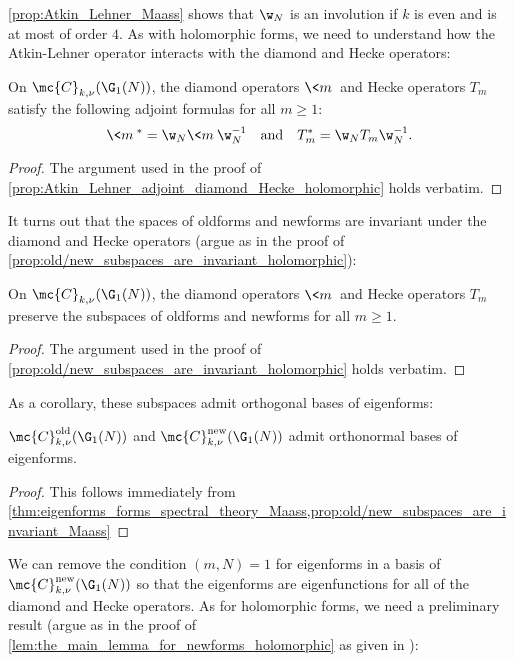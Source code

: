     \cref{prop:Atkin_Lehner_Maass} shows that $\w_{N}$ is an involution if $k$ is even and is at most of order $4$. As with holomorphic forms, we need to understand how the Atkin-Lehner operator interacts with the diamond and Hecke operators:

    \begin{proposition}\label{prop:Atkin_Lehner_adjoint_diamond_Hecke_Maass}
      On $\mc{C}_{k,\nu}(\G_{1}(N))$, the diamond operators $\<m\>$ and Hecke operators $T_{m}$ satisfy the following adjoint formulas for all $m \ge 1$:
      \[
        \<m\>^{\ast} = \w_{N}\<m\>\w_{N}^{-1} \quad \text{and} \quad T_{m}^{\ast} = \w_{N}T_{m}\w_{N}^{-1}.
      \]
    \end{proposition}
    \begin{proof}
      The argument used in the proof of \cref{prop:Atkin_Lehner_adjoint_diamond_Hecke_holomorphic} holds verbatim.
    \end{proof}
    
    It turns out that the spaces of oldforms and newforms are invariant under the diamond and Hecke operators (argue as in the proof of \cref{prop:old/new_subspaces_are_invariant_holomorphic}):

    \begin{proposition}\label{prop:old/new_subspaces_are_invariant_Maass}
      On $\mc{C}_{k,\nu}(\G_{1}(N))$, the diamond operators $\<m\>$ and Hecke operators $T_{m}$ preserve the subspaces of oldforms and newforms for all $m \ge 1$.
    \end{proposition}
    \begin{proof}
      The argument used in the proof of \cref{prop:old/new_subspaces_are_invariant_holomorphic} holds verbatim.
    \end{proof}

    As a corollary, these subspaces admit orthogonal bases of eigenforms:

    \begin{corollary}\label{cor:old/new_eigenbasis_Maass}
      $\mc{C}_{k,\nu}^{\mathrm{old}}(\G_{1}(N))$ and $\mc{C}_{k,\nu}^{\mathrm{new}}(\G_{1}(N))$ admit orthonormal bases of eigenforms.
    \end{corollary}
    \begin{proof}
      This follows immediately from \cref{thm:eigenforms_forms_spectral_theory_Maass,prop:old/new_subspaces_are_invariant_Maass}
    \end{proof}

    We can remove the condition $(m,N) = 1$ for eigenforms in a basis of $\mc{C}_{k,\nu}^{\mathrm{new}}(\G_{1}(N))$ so that the eigenforms are eigenfunctions for all of the diamond and Hecke operators. As for holomorphic forms, we need a preliminary result (argue as in the proof of \cref{lem:the_main_lemma_for_newforms_holomorphic} as given in \cite{diamond2005first}):

